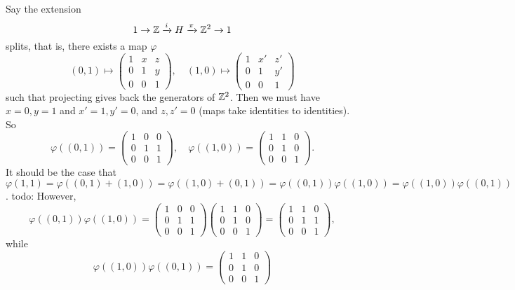 \begin{ex}
    Say the extension \[
    1 \to  \mathbb{Z} \xrightarrow iH \xrightarrow{\pi} \mathbb{Z}^2\to 1
    \] splits, that is, there exists a map $\varphi $ \[
    (0,1) \mapsto \begin{pmatrix}
       1 & x & z \\
       0 & 1 & y \\
       0 & 0 & 1
   \end{pmatrix} , \quad (1,0)\mapsto 
   \begin{pmatrix}
       1 & x' & z' \\
       0 & 1 & y' \\
       0 & 0 & 1
   \end{pmatrix}
   \] such that projecting gives back the generators of  $\mathbb{Z}^2$. Then we must have $x=0,y=1$ and  $x'=1,y'=0$, and $z,z'=0$ (maps take identities to identities). So \[
    \varphi ((0,1))=
    \begin{pmatrix}
        1 & 0 & 0 \\ 0 & 1 & 1 \\ 0 & 0 & 1
    \end{pmatrix}, \quad \varphi ((1,0))=
    \begin{pmatrix}
        1 & 1 & 0 \\ 0 & 1 & 0 \\ 0 & 0 & 1
    \end{pmatrix}.
    \] It should be the case that $\varphi (1,1)=\varphi ((0,1)+(1,0))=\varphi ((1,0)+(0,1))=\varphi ((0,1))\varphi ((1,0)) = \varphi ((1,0))\varphi ((0,1))$. {\color{red}todo:}  However, \[
    \varphi ((0,1))\varphi ((1,0))=
    \begin{pmatrix}
        1 & 0 & 0 \\ 0 & 1 & 1 \\ 0 & 0 & 1
    \end{pmatrix}
    \begin{pmatrix}
        1 & 1 & 0 \\ 0 & 1 & 0 \\ 0 & 0 & 1
    \end{pmatrix}=
    \begin{pmatrix}
        1 & 1 & 0 \\ 0 & 1 & 1 \\ 0 & 0 & 1
    \end{pmatrix},
    \] while \[
    \varphi ((1,0))\varphi ((0,1))= 
    \begin{pmatrix}
        1 & 1 & 0 \\ 0 & 1 & 0 \\ 0 & 0 & 1

\end{pmatrix}\]
\end{ex}
